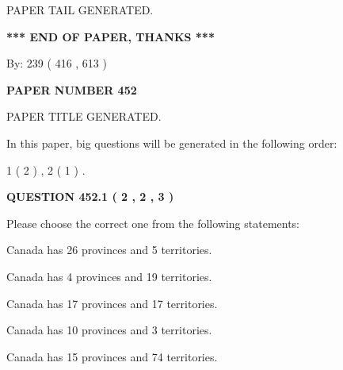 \documentclass[12pt]{article}
\begin{document}
   
   
\vspace{2.0in} PAPER TAIL GENERATED.
   
   
   
   
\vspace{1.0in} 
{\textbf{\large{ *** END OF PAPER, THANKS *** }}} 
   
   
\hspace{1.0in} By: 
 239 ( 416 ,  613 )
   
   
   
   
\newpage 
\setcounter{page}{ 
   452001 } 
   
   
   
   
 {\textbf{ \Large{ PAPER NUMBER  452  }}}
   
   
\vspace{0.2in}
   
   
   
   
   
   
   
   
 \vspace{0.2in}
 
 
 
 
   
   
 PAPER TITLE GENERATED.
   
   
   
\vspace{0.2in}
   
In this paper, big questions will be generated in the following order: 
   
   
   1 ( 2 )
 ,
   2 ( 1 )
 .
  
\vspace{0.2in}
  
{\textbf{\Large{QUESTION
452.1 
 ( 2 , 2 , 3 )
}}}
  
  
Please choose the correct one from the following statements:
 
 
Canada has  26 provinces and  5 territories.
 
 
Canada has   4 provinces and  19 territories.
 
 
Canada has  17 provinces and  17 territories.
 
 
Canada has 10  provinces and 3 territories.
 
 
Canada has  15 provinces and  74 territories.
 
\end{document}
